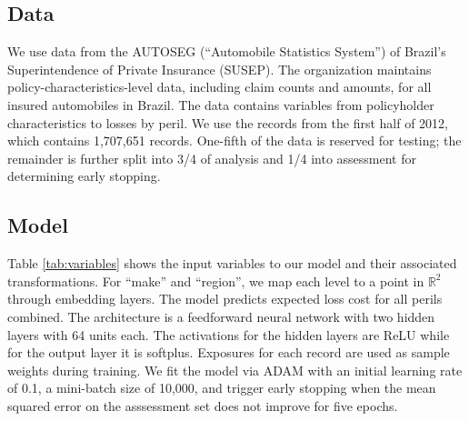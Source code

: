 \documentclass[preprint, 3p, twocolumn, letterpaper, 10pt]{elsarticle} %
\begin{document}
\hypertarget{data}{%
\subsection{Data}\label{data}}

We use data from the AUTOSEG (``Automobile Statistics System'') of Brazil's
Superintendence of Private Insurance (SUSEP). The organization maintains
policy-characteristics-level data, including claim counts and amounts, for all
insured automobiles in Brazil. The data contains variables from policyholder
characteristics to losses by peril. We use the records from the first half of
2012, which contains 1,707,651 records. One-fifth of the data is reserved for
testing; the remainder is further split into 3/4 of analysis and 1/4 into
assessment for determining early stopping.

\hypertarget{model}{%
\subsection{Model}\label{model}}

Table \ref{tab:variables} shows the input variables to our model and their
associated transformations. For ``make'' and ``region'', we map each level to a
point in \(\mathbb{R}^2\) through embedding layers. The model predicts expected
loss cost for all perils combined. The architecture is a feedforward
neural network with two hidden layers with 64 units each. The activations for
the hidden layers are ReLU while for the output layer it is softplus. Exposures
for each record are used as sample weights during training. We fit the model
via ADAM with an initial learning rate of 0.1, a mini-batch size of 10,000,
and trigger early stopping when the mean squared error on the asssessment set
does not improve for five epochs.
\end{document}
